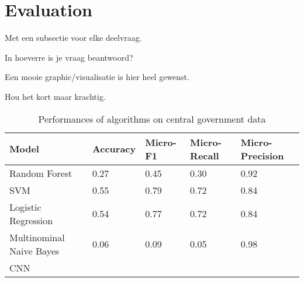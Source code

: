 \section{Evaluation}
\label{sec:eva}

Met een subsectie voor elke deelvraag.

In hoeverre is je vraag beantwoord?

Een mooie graphic/visualisatie is hier heel gewenst.

Hou het kort maar krachtig.


\begin{table}[]
\centering
\caption{Performances of algorithms on central government data}
\label{my-label}
\begin{tabular}{@{}lllll@{}}
\toprule
\textbf{Model}      		& \textbf{Accuracy} & \textbf{Micro-F1} & \textbf{Micro-Recall}   & \textbf{Micro-Precision} \\ \midrule
Random Forest      		&  0.27                 	  & 0.45                  	  & 0.30                   		& 0.92                  \\
SVM                 		&  0.55                 	  & 0.79                  	  & 0.72                     	& 0.84                  \\
Logistic Regression	 	&  0.54          	  & 0.77                 	  & 0.72                  		& 0.84                  \\
Multinominal Naive Bayes 	&  0.06	       	  & 0.09                	  & 0.05               	 	& 0.98                  \\
CNN                 		&                   	  &                   	  &                       		&                           \\ \bottomrule
\end{tabular}
\end{table}